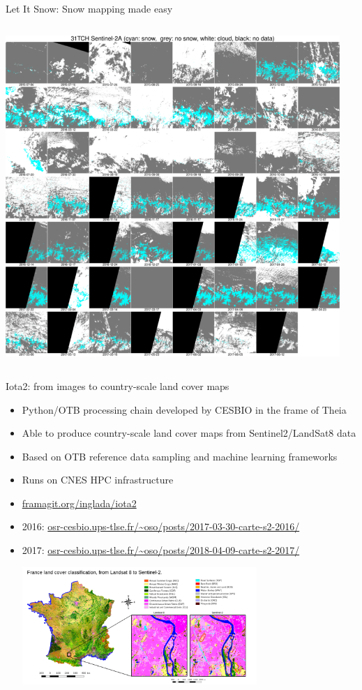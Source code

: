 \begin{frame}{Let It Snow: Snow mapping made easy}
\begin{columns}
\begin{center}
    \includegraphics[width=0.95\textwidth]{images/lis-series.png}
    \end{center}
  \end{columns}


\end{frame}

\begin{frame}{Iota2: from images to country-scale land cover maps}
  \begin{itemize}
    \item Python/OTB  processing chain developed by CESBIO in the frame of Theia
    \item Able to produce country-scale land cover maps from Sentinel2/LandSat8 data
    \item Based on OTB reference data sampling and machine learning frameworks
    \item Runs on CNES HPC infrastructure
    \item \url{framagit.org/inglada/iota2}
    \item 2016: \url{osr-cesbio.ups-tlse.fr/~oso/posts/2017-03-30-carte-s2-2016/}
    \item 2017: \url{osr-cesbio.ups-tlse.fr/~oso/posts/2018-04-09-carte-s2-2017/}
      \begin{center}
        \includegraphics[width=0.7\textwidth]{images/oso-2016.png}
        \end{center}
  \end{itemize}
      
\end{frame}

